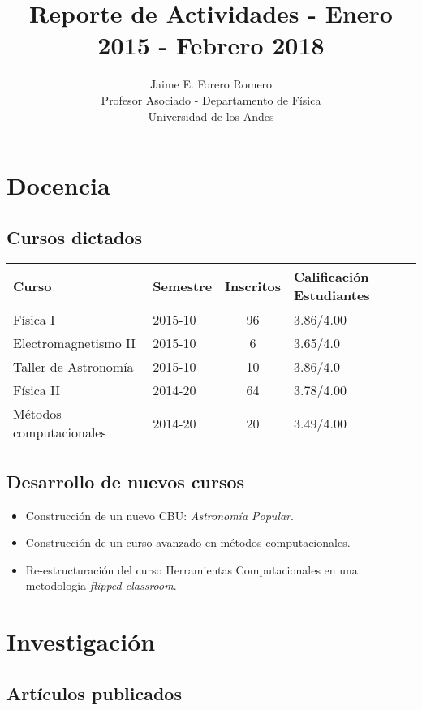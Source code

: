 \documentclass{article}
\title{Reporte de Actividades - Enero 2015 - Febrero 2018}
\author{Jaime E. Forero Romero\\Profesor Asociado - Departamento de
  F\'isica\\Universidad de los Andes}
\begin{document}
\maketitle
\tableofcontents
\newpage

\section{Docencia}

\subsection{Cursos dictados}
\begin{tabular}{p{6.0cm} l c p{2cm}}\hline
Curso & Semestre & Inscritos & Calificaci\'on Estudiantes\\\hline
F\'isica I & 2015-10 & 96 & 3.86/4.00 \\
Electromagnetismo II & 2015-10 & 6 & 3.65/4.0 \\
Taller de Astronom\'ia & 2015-10 & 10 & 3.86/4.0\\
F\'isica II & 2014-20 & 64 & 3.78/4.00\\
M\'etodos computacionales & 2014-20 & 20 & 3.49/4.00\\\hline
\end{tabular}

\subsection{Desarrollo de nuevos cursos}
\begin{itemize}
\item Construcci\'on de un nuevo CBU: \emph{Astronom\'ia Popular}.
\item Construcci\'on de un curso avanzado en m\'etodos computacionales.
\item Re-estructuraci\'on del curso Herramientas Computacionales en
  una metodolog\'ia \emph{flipped-classroom}.
\end{itemize}

\section{Investigaci\'on}

\subsection{Art\'iculos publicados}
\end{document}
